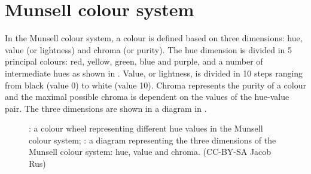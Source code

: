 \section{Munsell colour system}
\label{s:munsell}

In the Munsell colour system, a colour is defined based on three
dimensions: hue, value (or lightness) and chroma (or purity). The hue
dimension is divided in 5 principal colours: red, yellow, green, blue
and purple, and a number of intermediate hues as shown in . Value, or lightness, is divided in 10
steps ranging from black (value 0) to white (value 10). Chroma
represents the purity of a colour and the maximal possible chroma is
dependent on the values of the hue-value pair. The three dimensions
are shown in a diagram in .

\begin{figure}[htbp]
\centering
{}
\caption[The Munsell colour system]{: a colour wheel representing different hue values in the Munsell colour system; : a diagram representing the three dimensions of the Munsell colour system: hue, value and chroma. (CC-BY-SA Jacob Rus)}
\end{figure}

